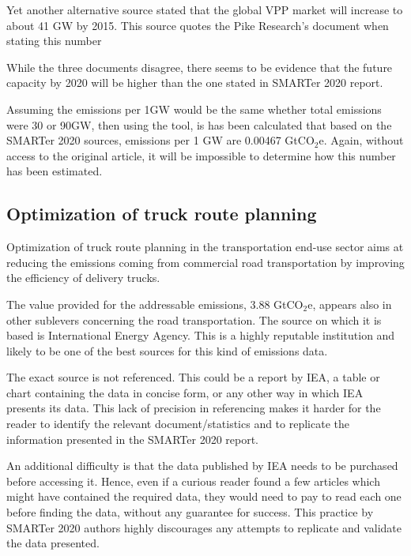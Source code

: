 Yet another alternative source stated that the global VPP market will increase to about 41 GW by 2015. This source quotes the Pike Research’s document when stating this number %

While the three documents disagree, there seems to be evidence that the future capacity by 2020 will be higher than the one stated in SMARTer 2020 report. 

Assuming the emissions per 1GW would be the same whether total emissions were 30 or 90GW, then using the tool, is has been calculated that based on the SMARTer 2020 sources, emissions per 1 GW are 0.00467 GtCO$_2$e. Again, without access to the original article, it will be impossible to determine how this number has been estimated.



\subsection{Optimization of truck route planning}

Optimization of truck route planning in the transportation end-use sector aims at reducing the emissions coming from commercial road transportation by improving the efficiency of delivery trucks. 

The value provided for the addressable emissions, 3.88 GtCO$_2$e, appears also in other sublevers concerning the road transportation. The source on which it is based is International Energy Agency. This is a highly reputable institution and likely to be one of the best sources for this kind of emissions data. 

The exact source is not referenced. This could be a report by IEA, a table or chart containing the data in concise form, or any other way in which IEA presents its data. This lack of precision in referencing makes it harder for the reader to identify the relevant document/statistics and to replicate the information presented in the SMARTer 2020 report.

An additional difficulty is that the data published by IEA needs to be purchased before accessing it. Hence, even if a curious reader found a few articles which might have contained the required data, they would need to pay to read each one before finding the data, without any guarantee for success. This practice by SMARTer 2020 authors highly discourages any attempts to replicate and validate the data presented.

